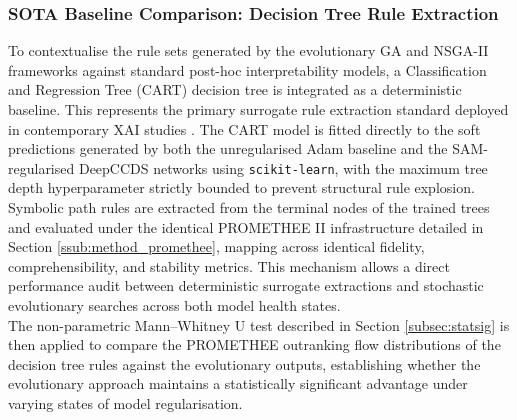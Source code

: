 \subsubsection{SOTA Baseline Comparison: Decision Tree Rule Extraction}
\label{ssub:method_sota_dt}
To contextualise the rule sets generated by the evolutionary GA and NSGA-II frameworks 
against standard post-hoc interpretability models, a Classification and Regression 
Tree (CART) decision tree \cite{Breiman1984} is integrated as a deterministic baseline. 
This represents the primary surrogate rule extraction standard deployed in contemporary 
XAI studies \cite{Arrieta2020}. The CART model is fitted directly to the soft 
predictions generated by both the unregularised Adam baseline and the SAM-regularised 
DeepCCDS networks using \texttt{scikit-learn}, with the maximum tree depth 
hyperparameter strictly bounded to prevent structural rule explosion. 
\\
Symbolic path rules are extracted from the terminal nodes of the trained trees and 
evaluated under the identical PROMETHEE II infrastructure detailed in Section 
\ref{ssub:method_promethee}, mapping across identical fidelity, comprehensibility, and 
stability metrics. This mechanism allows a direct performance audit between 
deterministic surrogate extractions and stochastic evolutionary searches across both 
model health states. 
\\
The non-parametric Mann--Whitney U test described in Section \ref{subsec:statsig} is 
then applied to compare the PROMETHEE outranking flow distributions of the decision 
tree rules against the evolutionary outputs, establishing whether the evolutionary 
approach maintains a statistically significant advantage under varying states of model 
regularisation.